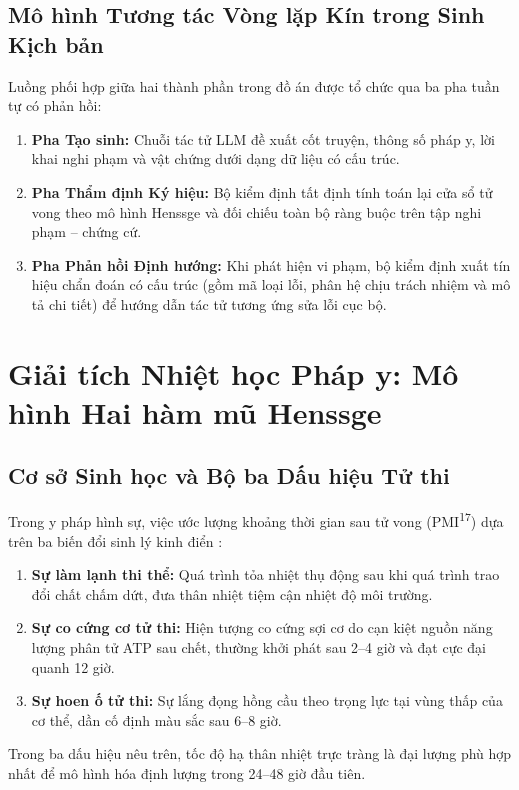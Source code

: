 \subsection{Mô hình Tương tác Vòng lặp Kín trong Sinh Kịch bản}
Luồng phối hợp giữa hai thành phần trong đồ án được tổ chức qua ba pha tuần tự có phản hồi:
\begin{enumerate}[leftmargin=1.5cm]
    \item \textbf{Pha Tạo sinh:} Chuỗi tác tử LLM đề xuất cốt truyện, thông số pháp y, lời khai nghi phạm và vật chứng dưới dạng dữ liệu có cấu trúc.
    \item \textbf{Pha Thẩm định Ký hiệu:} Bộ kiểm định tất định tính toán lại cửa sổ tử vong theo mô hình Henssge và đối chiếu toàn bộ ràng buộc trên tập nghi phạm -- chứng cứ.
    \item \textbf{Pha Phản hồi Định hướng:} Khi phát hiện vi phạm, bộ kiểm định xuất tín hiệu chẩn đoán có cấu trúc (gồm mã loại lỗi, phân hệ chịu trách nhiệm và mô tả chi tiết) để hướng dẫn tác tử tương ứng sửa lỗi cục bộ.
\end{enumerate}

\section{Giải tích Nhiệt học Pháp y: Mô hình Hai hàm mũ Henssge}
\label{sec:theory_henssge}

\subsection{Cơ sở Sinh học và Bộ ba Dấu hiệu Tử thi}
Trong y pháp hình sự, việc ước lượng khoảng thời gian sau tử vong (PMI\textsuperscript{17}) dựa trên ba biến đổi sinh lý kinh điển \cite{madea2005recent}:
\begin{enumerate}[leftmargin=1.5cm]
    \item \textbf{Sự làm lạnh thi thể:} Quá trình tỏa nhiệt thụ động sau khi quá trình trao đổi chất chấm dứt, đưa thân nhiệt tiệm cận nhiệt độ môi trường.
    \item \textbf{Sự co cứng cơ tử thi:} Hiện tượng co cứng sợi cơ do cạn kiệt nguồn năng lượng phân tử ATP sau chết, thường khởi phát sau 2--4 giờ và đạt cực đại quanh 12 giờ.
    \item \textbf{Sự hoen ố tử thi:} Sự lắng đọng hồng cầu theo trọng lực tại vùng thấp của cơ thể, dần cố định màu sắc sau 6--8 giờ.
\end{enumerate}

Trong ba dấu hiệu nêu trên, tốc độ hạ thân nhiệt trực tràng là đại lượng phù hợp nhất để mô hình hóa định lượng trong 24--48 giờ đầu tiên.

